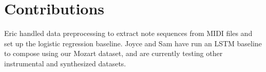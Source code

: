 \documentclass[twoside,twocolumn]{article}
\begin{document}

\section{Contributions}

Eric handled data preprocessing to extract note sequences from MIDI files and set up the logistic regression baseline. Joyce and Sam have run an LSTM baseline to compose using our Mozart dataset, and are currently testing other instrumental and synthesized datasets.






\end{document}
